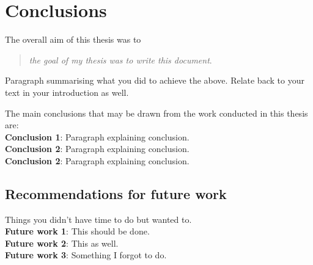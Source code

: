 
\cleardoublepage
\chapter{Conclusions}

  The overall aim of this thesis was to

  \begin{quote}
    \emph{the goal of my thesis was to write this document}.
  \end{quote}

  \noindent Paragraph summarising what you did to achieve the above. Relate back to your text in your introduction as well.

  The main conclusions that may be drawn from the work conducted in this thesis are:\\

  \noindent\textbf{Conclusion 1}: Paragraph explaining conclusion.\\

  \noindent\textbf{Conclusion 2}: Paragraph explaining conclusion.\\

  \noindent\textbf{Conclusion 2}: Paragraph explaining conclusion.\\

  \section{Recommendations for future work}

    Things you didn't have time to do but wanted to.\\

    \noindent\textbf{Future work 1}: This should be done.\\

    \noindent\textbf{Future work 2}: This as well.\\

    \noindent\textbf{Future work 3}: Something I forgot to do.\\